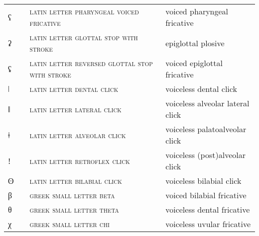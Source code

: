 \begin{center}
\begin{xtabular}{ l L{1.1cm} L{5.4cm} L{4.2cm} }
ʕ &  & \textsc{latin letter pharyngeal voiced fricative} & voiced pharyngeal fricative \\ 
ʡ &  & \textsc{latin letter glottal stop with stroke} & epiglottal plosive \\ 
ʢ &  & \textsc{latin letter reversed glottal stop with stroke} & voiced epiglottal fricative \\ 
ǀ &  & \textsc{latin letter dental click} & voiceless dental click \\ 
ǁ &  & \textsc{latin letter lateral click} & voiceless alveolar lateral click \\ 
ǂ &  & \textsc{latin letter alveolar click} & voiceless palatoalveolar click \\ 
ǃ &  & \textsc{latin letter retroflex click} & voiceless (post)alveolar click \\ 
ʘ &  & \textsc{latin letter bilabial click} & voiceless bilabial click \\ 
β &  & \textsc{greek small letter beta} & voiced bilabial fricative \\ 
θ &  & \textsc{greek small letter theta} & voiceless dental fricative \\ 
χ &  & \textsc{greek small letter chi} & voiceless uvular fricative \\
\end{xtabular}
\end{center}
